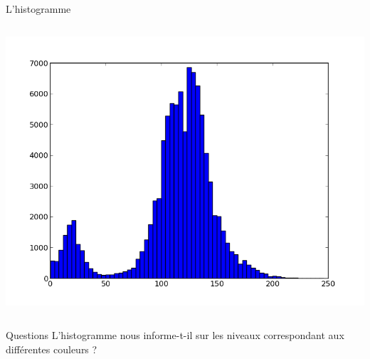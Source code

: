 \documentclass[8pt,a4paper]{beamer}
\begin{document}
\begin{frame}{L'histogramme}
  \begin{columns}
\includegraphics[width=1.\textwidth]{figures/image_hist.png}

\end{columns}
\begin{alertblock}{Questions}
L'histogramme nous informe-t-il sur les niveaux correspondant aux différentes couleurs ?
\end{alertblock}
\end{frame}
\end{document}

